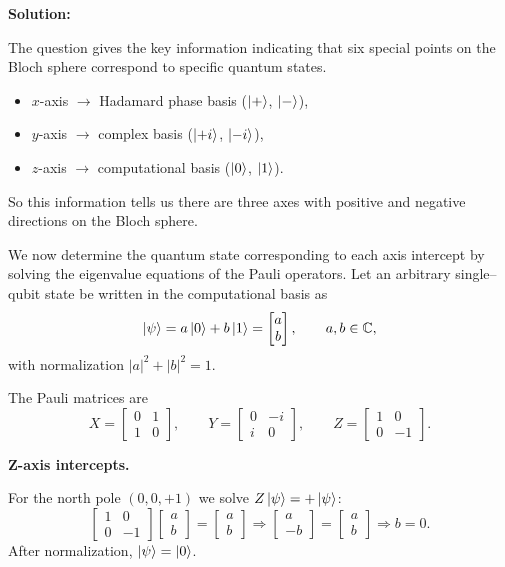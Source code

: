 \documentclass[11pt]{article}
\newenvironment{solution}
{\par\noindent\textbf{Solution:}\par}
{\vspace{1em}}
\begin{document}
\begin{solution}

The question gives the key information indicating that six special points on the Bloch sphere correspond to specific quantum states.

\begin{itemize}
\item $x$-axis $\rightarrow$ Hadamard phase basis ($\ket{+}$, $\ket{-}$),
\item $y$-axis $\rightarrow$ complex basis ($\ket{+i}$, $\ket{-i}$),
\item $z$-axis $\rightarrow$ computational basis ($\ket{0}$, $\ket{1}$).
\end{itemize}

So this information tells us there are three axes with positive and negative directions on the Bloch sphere.

We now determine the quantum state corresponding to each axis intercept by solving the eigenvalue equations of the Pauli operators. 
Let an arbitrary single–qubit state be written in the computational basis as
\[
\ket{\psi}=a\ket{0}+b\ket{1}=\begin{bmatrix}a\\ b\end{bmatrix}, 
\qquad a,b\in\mathbb{C},
\]
with normalization $|a|^2+|b|^2=1$.

The Pauli matrices are
\[
X=\begin{bmatrix}0&1\\1&0\end{bmatrix},\qquad
Y=\begin{bmatrix}0&-i\\ i&0\end{bmatrix},\qquad
Z=\begin{bmatrix}1&0\\0&-1\end{bmatrix}.
\]

\textbf{Z-axis intercepts.}

For the north pole $(0,0,+1)$ we solve $Z\ket{\psi}=+\ket{\psi}$:
\[
\begin{bmatrix}1&0\\0&-1\end{bmatrix}
\begin{bmatrix}a\\ b\end{bmatrix}
=
\begin{bmatrix}a\\ b\end{bmatrix}
\Rightarrow
\begin{bmatrix}a\\ -b\end{bmatrix}
=
\begin{bmatrix}a\\ b\end{bmatrix}
\Rightarrow b=0.
\]
After normalization, $\ket{\psi}=\ket{0}$.


\end{solution}
\end{document}
